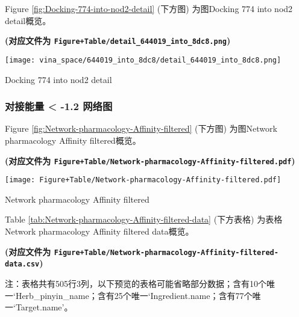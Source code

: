 \documentclass[
]{article}
\begin{document}
Figure \ref{fig:Docking-774-into-nod2-detail} (下方图) 为图Docking 774 into nod2 detail概览。

\textbf{(对应文件为 \texttt{Figure+Table/detail\_644019\_into\_8dc8.png})}

\def\@captype{figure}
\begin{center}
\texttt{[image: vina\_space/644019\_into\_8dc8/detail\_644019\_into\_8dc8.png]}
\caption{Docking 774 into nod2 detail}\label{fig:Docking-774-into-nod2-detail}
\end{center}

\hypertarget{ux5bf9ux63a5ux80fdux91cf--1.2-ux7f51ux7edcux56fe}{%
\subsubsection{对接能量 \textless{} -1.2 网络图}\label{ux5bf9ux63a5ux80fdux91cf--1.2-ux7f51ux7edcux56fe}}

Figure \ref{fig:Network-pharmacology-Affinity-filtered} (下方图) 为图Network pharmacology Affinity filtered概览。

\textbf{(对应文件为 \texttt{Figure+Table/Network-pharmacology-Affinity-filtered.pdf})}

\def\@captype{figure}
\begin{center}
\texttt{[image: Figure+Table/Network-pharmacology-Affinity-filtered.pdf]}
\caption{Network pharmacology Affinity filtered}\label{fig:Network-pharmacology-Affinity-filtered}
\end{center}

Table \ref{tab:Network-pharmacology-Affinity-filtered-data} (下方表格) 为表格Network pharmacology Affinity filtered data概览。

\textbf{(对应文件为 \texttt{Figure+Table/Network-pharmacology-Affinity-filtered-data.csv})}

\begin{center}\begin{tcolorbox}[colback=gray!10, colframe=gray!50, width=0.9\linewidth, arc=1mm, boxrule=0.5pt]注：表格共有505行3列，以下预览的表格可能省略部分数据；含有10个唯一`Herb\_pinyin\_name；含有25个唯一`Ingredient.name；含有77个唯一`Target.name'。
\end{tcolorbox}
\end{center}
\end{document}
